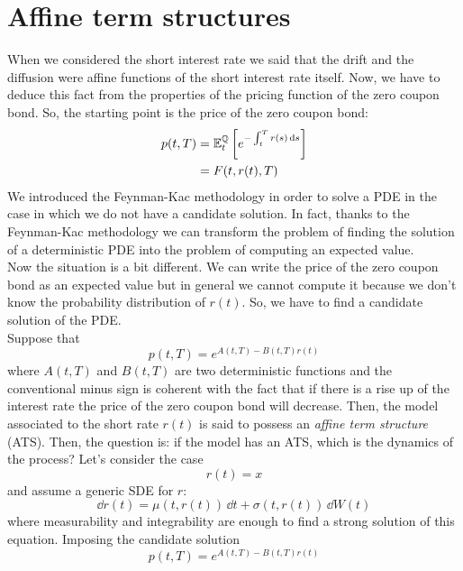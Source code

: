 \section{Affine term structures} %
When we considered the short interest rate we said that the drift and the diffusion were affine functions of the short interest rate itself. Now, we have to deduce this fact from the properties of the pricing function of the zero coupon bond. So, the starting point is the price of the zero coupon bond:
\begin{align*}
    p(t,T) &= \mathbb{E}^{\mathbb{Q}}_t\left[e^{-\int_t^T r(s)\,\dd s}\right] \\
    &=
    F(t, r(t), T)
\end{align*}
We introduced the Feynman-Kac methodology in order to solve a PDE in the case in which we do not have a candidate solution. In fact, thanks to the Feynman-Kac methodology we can transform the problem of finding the solution of a deterministic PDE into the problem of computing an expected value. \\
Now the situation is a bit different. We can write the price of the zero coupon bond as an expected value but in general we cannot compute it because we don't know the probability distribution of $r(t)$. So, we have to find a candidate solution of the PDE.\\
Suppose that
\begin{equation}
    p(t,T) = e^{A(t,T)-B(t,T)r(t)}
\end{equation}
where $A(t,T)$ and $B(t,T)$ are two deterministic functions and the conventional minus sign is coherent with the fact that if there is a rise up of the interest rate the price of the zero coupon bond will decrease. Then, the model associated to the short rate $r(t)$ is said to possess an \emph{affine term structure} (ATS).
Then, the question is: if the model has an ATS, which is the dynamics of the process? Let's consider the case
\begin{equation*}
    r(t) = x
\end{equation*}
and assume a generic SDE for $r$:
\begin{equation}
    \dd r(t) = \mu(t,r(t))\,\dd t + \sigma(t,r(t))\,\dd W(t)
\end{equation}
where measurability and integrability are enough to find a strong solution of this equation. Imposing the candidate solution
\begin{equation*}
    p(t,T) = e^{A(t,T)-B(t,T)r(t)}
\end{equation*}
